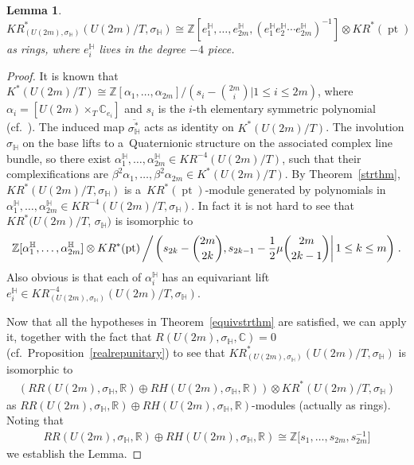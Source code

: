 \documentclass[pdftex]{sigma}
\numberwithin{equation}{section}
\newtheorem{Lemma}[Theorem]{Lemma}
\DeclareMathOperator{\pt}{pt}
\begin{document}
\begin{Lemma}
\label{quatring}
$KR^*_{(U(2m),
\sigma_\mathbb{H})}(U(2m)/T,
\sigma_\mathbb{H})\cong \mathbb{Z}[e_1^\mathbb{H}, \dots, e_{2m}^\mathbb{H}, (e_1^\mathbb{H}e_2^\mathbb{H}\cdots
e_{2m}^\mathbb{H})^{-1}]\otimes KR^*(\pt)$ as rings, where $e_i^\mathbb{H}$ lives in the degree $-4$ piece.
\end{Lemma}
\begin{proof}
It is known that $K^*(U(2m)/T)\cong\mathbb{Z}[\alpha_1, \dots, \alpha_{2m}]/(s_i-\binom{2m}{i}|1\leq i\leq 2m)$, where
$\alpha_i=[U(2m)\times_T\mathbb{C}_{e_i}]$ and $s_i$ is the $i$-th elementary symmetric polynomial (cf.~\cite[Proposition 2.7.13]{At}).
The induced map $\overline{\sigma_\mathbb{H}^*}$ acts as identity on $K^*(U(2m)/T)$.
The involution $\sigma_\mathbb{H}$ on the base lifts to a~Quaternionic structure
on the associated complex line bundle, so there \mbox{exist}
$\alpha_1^\mathbb{H}, \dots, \alpha_{2m}^\mathbb{H}\in KR^{-4}(U(2m)/T)$, such that their complexif\/ications are
$\beta^2\alpha_1, \dots, \beta^2\alpha_{2m}\in K^*(U(2m)/T)$.
By Theorem~\ref{strthm}, $KR^*(U(2m)/T,
\sigma_\mathbb{H})$ is a~$KR^*(\pt)$-module generated by polynomials in $\alpha_1^\mathbb{H}, \dots, \alpha_{2m}^\mathbb{H}\in
KR^{-4}(U(2m)/T,
\sigma_\mathbb{H})$.
In fact it is not hard to see that $KR^*(U(2m)/T$,
$\sigma_\mathbb{H})$ is isomorphic to
\begin{gather*}
\mathbb{Z}[\alpha_1^\mathbb{H}, \dots, \alpha_{2m}^\mathbb{H}]\otimes
KR^*(\pt)\left/\left.\left(s_{2k}-\binom{2m}{2k}, s_{2k-1}-\frac{1}{2}\mu\binom{2m}{2k-1}\right|1\leq k\leq
m\right)\right..
\end{gather*}
Also obvious is that each of $\alpha_i^\mathbb{H}$ has an equivariant lift $e_i^\mathbb{H}\in KR^{-4}_{(U(2m),
\sigma_\mathbb{H})}(U(2m)/T,\sigma_\mathbb{H})$.

Now that all the hypotheses in Theorem~\ref{equivstrthm} are satisf\/ied, we can apply it, together with the fact that
$R(U(2m),
\sigma_\mathbb{H}, \mathbb{C})=0$ (cf.\ Proposition~\ref{realrepunitary}) to see that $KR^*_{(U(2m),
\sigma_\mathbb{H})}(U(2m)/T,
\sigma_\mathbb{H})$ is isomorphic to
\begin{gather*}
(RR(U(2m),
\sigma_\mathbb{H}, \mathbb{R})\oplus RH(U(2m),
\sigma_\mathbb{H}, \mathbb{R}))\otimes KR^*(U(2m)/T,
\sigma_\mathbb{H})
\end{gather*}
as $RR(U(2m),
\sigma_\mathbb{H}, \mathbb{R})\oplus RH(U(2m),
\sigma_\mathbb{H}, \mathbb{R})$-modules (actually as rings).
Noting that
\begin{gather*}
RR(U(2m),\sigma_\mathbb{H}, \mathbb{R})\oplus RH(U(2m),
\sigma_\mathbb{H}, \mathbb{R})\cong\mathbb{Z}\big[s_1, \dots, s_{2m}, s_{2m}^{-1}\big]
\end{gather*}
we establish the Lemma.
\end{proof}
\end{document}
